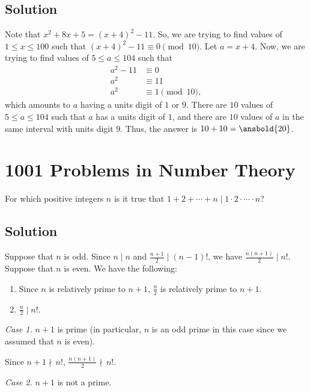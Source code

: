\documentclass[mast]{lucky}
\begin{document}
\subsection{Solution}

Note that $x^2 + 8x + 5 = (x + 4)^2 - 11$. So, we are trying to find values of $1 \leq x \leq 100$ such that $(x + 4)^2 - 11 \equiv 0 \pmod{10}$. Let $a = x + 4$. Now, we are trying to find values of $5 \leq a \leq 104$ such that
\begin{align*}
a^2 - 11 &\equiv 0 \\
a^2 &\equiv 11 \\
a^2 &\equiv 1 \pmod{10},
\end{align*}
which amounts to $a$ having a units digit of $1$ or $9$. There are $10$ values of $5 \leq a \leq 104$ such that $a$ has a units digit of $1$, and there are $10$ values of $a$ in the same interval with units digit $9$. Thus, the answer is $10 + 10 = \ansbold{20}$.

\pagebreak\section{1001 Problems in Number Theory}

For which positive integers $n$ is it true that $1+2+\cdots+n\mid 1\cdot 2\cdot \cdots \cdot n$?

\subsection{Solution}

Suppose that $n$ is odd. Since $n \mid n$ and $\frac{n + 1}{2} \mid (n - 1)!$, we have $\frac{n(n + 1)}{2} \mid n!$. Suppose that $n$ is even. We have the following: 
\begin{enumerate}
\item Since $n$ is relatively prime to $n + 1$, $\frac{n}{2}$ is relatively prime to $n + 1$.
\item $\frac{n}{2} \mid n!$.
\end{enumerate}

\emph{Case 1.} $n + 1$ is prime (in particular, $n$ is an odd prime in this case since we assumed that $n$ is even). 

\bigskip 

Since $n + 1 \nmid \, n!$, $\frac{n(n + 1)}{2} \nmid \, n!$. 

\bigskip

\emph{Case 2.} $n + 1$ is not a prime. 

\bigskip 
\end{document}
